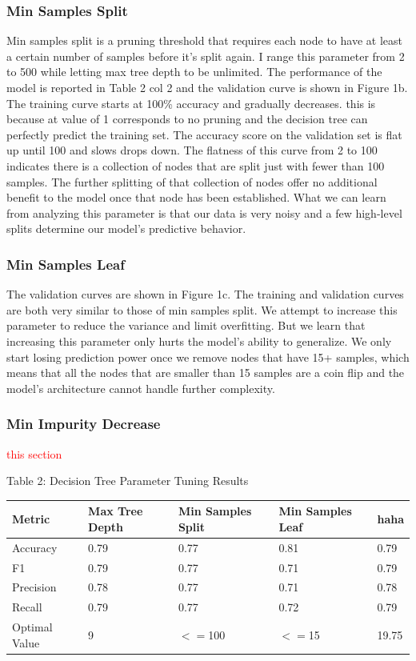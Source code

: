 \documentclass{article}
\newcommand\todo[1]{\textcolor{red}{#1}}
\begin{document}
\subsubsection*{Min Samples Split}
Min samples split is a pruning threshold that requires each node to have at least a certain number of samples before it's split again. I range this parameter from 2 to 500 while letting max tree depth to be unlimited. The performance of the model is reported in Table 2 col 2 and the validation curve is shown in Figure 1b. The training curve starts at 100\% accuracy and gradually decreases. this is because at value of 1 corresponds to no pruning and the decision tree can perfectly predict the training set. The accuracy score on the validation set is flat up until 100 and slows drops down. The flatness of this curve from 2 to 100 indicates there is a collection of nodes that are split just with fewer than 100 samples. The further splitting of that collection of nodes offer no additional benefit to the model once that node has been established. What we can learn from analyzing this parameter is that our data is very noisy and a few high-level splits determine our model's predictive behavior. 

\subsubsection*{Min Samples Leaf}
The validation curves are shown in Figure 1c. The training and validation curves are both very similar to those of min samples split. We attempt to increase this parameter to reduce the variance and limit overfitting. But we learn that increasing this parameter only hurts the model's ability to generalize. We only start losing prediction power once we remove nodes that have 15+ samples, which means that all the nodes that are smaller than 15 samples are a coin flip and the model's architecture cannot handle further complexity. 

\subsubsection*{Min Impurity Decrease}

\todo{ this section}

\begin{center}
	Table 2: Decision Tree Parameter Tuning Results
	\begin{tabular}{ l l l l l }
		\hline
		Metric & Max Tree Depth & Min Samples Split & Min Samples Leaf & haha \\
		\hline
		Accuracy & 0.79 & 0.77 & 0.81 & 0.79 \\
		F1 & 0.79 & 0.77 & 0.71 & 0.79 \\
		Precision & 0.78 & 0.77 & 0.71 & 0.78 \\
		Recall & 0.79 & 0.77 & 0.72 & 0.79 \\
		Optimal Value & 9 & $<=$100 & $<=$15 & 19.75\\
		\hline 
		
		
	\end{tabular}
\end{center}
\end{document}
